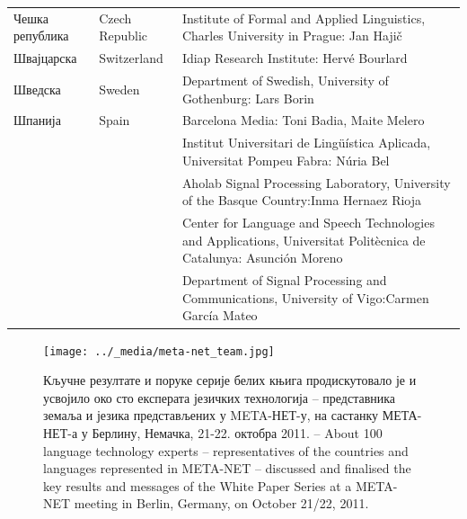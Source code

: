 \begin{longtable}{llp{114mm}}
  Чешка република & \textcolor{grey1}{Czech Republic} & Institute of Formal and Applied Linguistics, Charles University in Prague: Jan Hajič \\ \addlinespace
  Швајцарска & \textcolor{grey1}{Switzerland} & Idiap Research Institute: Hervé Bourlard \\ \addlinespace 
  Шведска & \textcolor{grey1}{Sweden} & Department of Swedish, University of Gothenburg: Lars Borin \\ \addlinespace 
  Шпанија &  \textcolor{grey1}{Spain} & Barcelona Media: Toni Badia, Maite Melero \\ \addlinespace 
  & & Institut Universitari de Lingüística Aplicada, Universitat Pompeu Fabra: Núria Bel \\ \addlinespace 
  & & Aholab Signal Processing Laboratory, University of the Basque Country:\newline Inma Hernaez Rioja \\ \addlinespace 
  & & Center for Language and Speech Technologies and Applications, Universitat Politècnica de Catalunya:  Asunción Moreno \\ \addlinespace 
  & & Department of Signal Processing and Communications, University of Vigo:\newline Carmen García Mateo  
    
\end{longtable}
\normalsize

\renewcommand*{\figureformat}{}
\renewcommand*{\captionformat}{}

\begin{figure}[htbp]
  \center
  \texttt{[image: ../\_media/meta-net\_team.jpg]}
  \caption{Кључне резултате и поруке серије белих књига продискутовало је и усвојило око сто експерата језичких технологија  -- представника земаља и језика представљених у META-НЕТ-у, на састанку МЕТА-НЕТ-а у Берлину, Немачка, 21-22. октобра 2011. -- About 100 language technology experts – representatives of the countries and languages represented
in META-NET – discussed and finalised the key results and messages of the White Paper Series at a META-NET
meeting in Berlin, Germany, on October 21/22, 2011.}
  \medskip
\end{figure}


\label{whitepaperseries}

